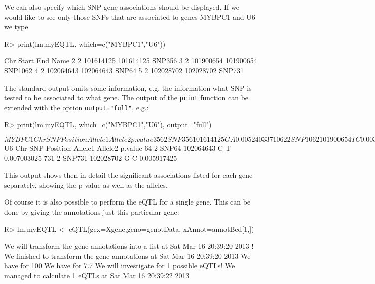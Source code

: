 \documentclass[a4paper,10pt]{article}
\begin{document}
We can also specify which SNP-gene associations should be displayed. If we would like to see only those SNPs that are associated to genes 
MYBPC1 and U6 we type

\begin{Schunk}
\begin{Sinput}
R> print(lm.myEQTL, which=c("MYBPC1","U6"))
\end{Sinput}
\begin{Soutput}
  Chr     Start       End    Name
2   2 101614125 101614125  SNP356
3   2 101900654 101900654 SNP1062
4   2 102064643 102064643   SNP64
5   2 102028702 102028702  SNP731
\end{Soutput}
\end{Schunk}

The standard output omits some information, e.g. the information what SNP is tested to be associated to what gene. The output of the \texttt{print}
function can be extended with the option \texttt{output="full"}, e.g.:

\begin{Schunk}
\begin{Sinput}
R> print(lm.myEQTL, which=c("MYBPC1","U6"), output="full")
\end{Sinput}
\begin{Soutput}
$MYBPC1
     Chr     SNP  Position Allele1 Allele2     p.value
356    2  SNP356 101614125       G       A 0.005240337
1062   2 SNP1062 101900654       T       C 0.003763006

$U6
    Chr    SNP  Position Allele1 Allele2     p.value
64    2  SNP64 102064643       C       T 0.007003025
731   2 SNP731 102028702       G       C 0.005917425
\end{Soutput}
\end{Schunk}

This output shows then in detail the significant associations listed for each gene separately, showing the p-value as well as the alleles. 


Of course it is also possible to perform the eQTL for a single gene. This can be done by giving the annotations just this particular gene:

\begin{Schunk}
\begin{Sinput}
R> lm.myEQTL <- eQTL(gex=Xgene,geno=genotData, xAnnot=annotBed[1,])
\end{Sinput}
\begin{Soutput}
We will transform the gene annotations into a list at Sat Mar 16 20:39:20 2013 !
We finished to transform the gene annotations at Sat Mar 16 20:39:20 2013 
We have for 100 % of the samples in the expression data the genotype information. 
We have for 7.7 % of the expression data the annotations. 
We will investigate for 1 possible eQTLs! 
We managed to calculate 1 eQTLs at Sat Mar 16 20:39:22 2013 
\end{Soutput}
\end{Schunk}
\end{document}
